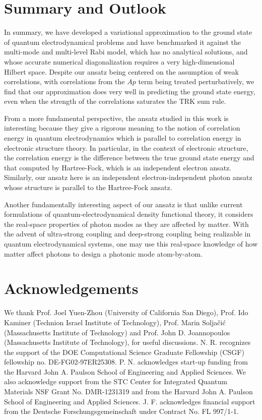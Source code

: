 \documentclass[aps,prb,twocolumn,
	groupedaddress,superscriptaddress,
	amsfonts,amssymb,amsmath,floatfix,
	citeautoscript]{revtex4-1}
\begin{document}
\section{Summary and Outlook}
In summary, we have developed a variational approximation to the ground state of quantum electrodynamical problems and have benchmarked it against the multi-mode and multi-level Rabi model, which has no analytical solutions, and whose accurate numerical diagonalization requires a very high-dimensional Hilbert space. Despite our ansatz being centered on the assumption of weak correlations, with correlations from the $Ap$ term being treated perturbatively, we find that our approximation does very well in predicting the ground state energy, even when the strength of the correlations saturates the TRK sum rule. 

From a more fundamental perspective, the ansatz studied in this work is interesting because they give a rigorous meaning to the notion of correlation energy in quantum electrodynamics which is parallel to correlation energy in electronic structure theory. In particular, in the context of electronic structure, the correlation energy is the difference between the true ground state energy and that computed by Hartree-Fock, which is an independent electron ansatz. Similarly, our ansatz here is an independent electron-independent photon ansatz whose structure is parallel to the Hartree-Fock ansatz. 

Another fundamentally interesting aspect of our ansatz is that unlike current formulations of quantum-electrodynamical density functional theory, it considers the real-space properties of photon modes as they are affected by matter. With the advent of ultra-strong coupling and deep-strong coupling being realizable in quantum electrodynamical systems, one may use this real-space knowledge of how matter affect photons to design a photonic mode atom-by-atom.

\section{Acknowledgements}
We thank Prof. Joel Yuen-Zhou (University of California San Diego), Prof. Ido Kaminer (Technion Israel Institute of Technology), Prof. Marin Solja\v{c}i\'{c} (Massachusetts Institute of Technology) and Prof. John D. Joannopoulos (Massachusetts Institute of Technology), for useful discussions. N. R. recognizes the support of the DOE Computational Science Graduate Fellowship (CSGF) fellowship no.  DE-FG02-97ER25308. P. N. acknowledges start-up funding from the Harvard John A. Paulson School of Engineering and Applied Sciences.  We also acknowledge support from the STC Center for Integrated Quantum Materials NSF Grant No. DMR-1231319 and from the Harvard John A. Paulson School of Engineering and Applied Sciences. J. F. acknowledges financial support from the Deutsche Forschungsgemeinschaft under Contract No. FL 997/1-1.



\end{document}
